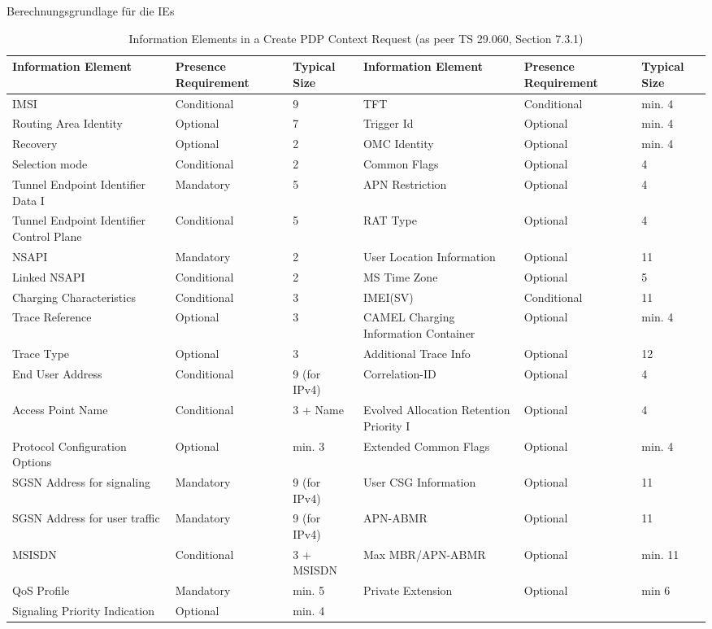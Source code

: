 Berechnungsgrundlage für die IEs
\begin{table}[htb]
\caption{Information Elements in a Create PDP Context Request (as peer TS 29.060, Section 7.3.1)}
\label{tab:createrequestelements}
\begin{tabular}{|p{4cm}|p{2cm}|p{2cm}|p{4cm}|p{2cm}|p{2cm}|} \hline
\textbf{Information Element} & \textbf{Presence Requirement} & \textbf{Typical Size} & \textbf{Information Element} & \textbf{Presence Requirement} & \textbf{Typical Size} \\ \hline
IMSI & Conditional & 9 & TFT & Conditional & min. 4\\ \hline
Routing Area Identity & Optional & 7 & Trigger Id & Optional & min. 4 \\ \hline
Recovery & Optional & 2 & OMC Identity & Optional & min. 4 \\ \hline
Selection mode	& Conditional & 2 & Common Flags & Optional & 4\\ \hline
Tunnel Endpoint Identifier Data I & Mandatory & 5 & APN Restriction & Optional & 4\\ \hline
Tunnel Endpoint Identifier Control Plane & Conditional & 5 & RAT Type & Optional & 4\\ \hline
\gls{NSAPI} & Mandatory & 2 & User Location Information & Optional & 11\\ \hline
Linked NSAPI & Conditional & 2 & MS Time Zone & Optional & 5\\ \hline
Charging Characteristics & Conditional & 3 & IMEI(SV) & Conditional & 11\\ \hline
Trace Reference & Optional & 3 & CAMEL Charging Information Container & Optional & min. 4\\ \hline
Trace Type & Optional & 3 & Additional Trace Info & Optional & 12\\ \hline
End User Address & Conditional & 9 (for IPv4) & Correlation-ID & Optional & 4\\ \hline
Access Point Name & Conditional & 3 + Name & Evolved Allocation Retention Priority I & Optional & 4\\ \hline
Protocol Configuration Options & Optional & min. 3 & Extended Common Flags & Optional & min. 4\\ \hline
SGSN Address for signaling & Mandatory  & 9 (for IPv4) & User CSG Information & Optional & 11 \\ \hline
SGSN Address for user traffic & Mandatory & 9 (for IPv4) & APN-ABMR & Optional  & 11 \\ \hline
MSISDN & Conditional & 3 + MSISDN & Max MBR/APN-ABMR & Optional & min. 11 \\ \hline
QoS Profile & Mandatory & min. 5 & Private Extension & Optional & min 6\\ \hline
Signaling Priority Indication & Optional & min. 4 & & & \\ \hline
\end{tabular}
\end{table}

